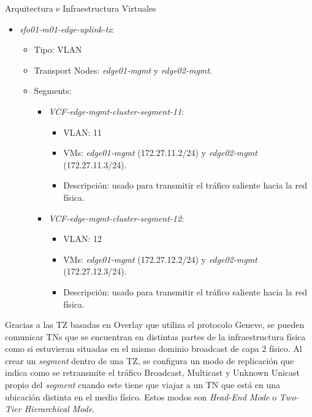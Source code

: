 \begin{subsection}{Arquitectura e Infraestructura Virtuales\cite{CFVirtInfraes}}
\begin{itemize}
\begin{itemize}
\begin{itemize}
\begin{itemize}
            \end{itemize}
        \end{itemize}
    \end{itemize}
  \item \textit{sfo01-m01-edge-uplink-tz}:
    \begin{itemize}
      \item Tipo: VLAN
      \item Transport Nodes: \textit{edge01-mgmt} y \textit{edge02-mgmt}.
      \item Segments:
        \begin{itemize}
          
          \item \textit{VCF-edge-mgmt-cluster-segment-11}:
            \begin{itemize}
              \item VLAN: 11
              \item VMs: \textit{edge01-mgmt} (172.27.11.2/24) y \textit{edge02-mgmt} (172.27.11.3/24).
              \item Descripción: usado para transmitir el tráfico saliente hacia la red física.
            \end{itemize}
          \item \textit{VCF-edge-mgmt-cluster-segment-12}:
            \begin{itemize}
              \item VLAN: 12
              \item VMs: \textit{edge01-mgmt} (172.27.12.2/24) y \textit{edge02-mgmt} (172.27.12.3/24).
              \item Descripción: usado para transmitir el tráfico saliente hacia la red física.
            \end{itemize}
        \end{itemize}
      \end{itemize}
\end{itemize}

Gracias a las TZ basadas en Overlay que utiliza el protocolo Geneve, se pueden comunicar TNs que se encuentran en distintas partes de la infraestructura física como si estuvieran situadas en el mismo dominio broadcast de capa 2 físico. Al crear un \textit{segment} dentro de una TZ, se configura un modo de replicación que indica como se retransmite el tráfico Broadcast, Multicast y Unknown Unicast propio del \textit{segment} cuando este tiene que viajar a un TN que está en una ubicación distinta en el medio físico. Estos modos son \textit{Head-End Mode} o \textit{Two-Tier Hierarchical Mode}.


\end{subsection}
